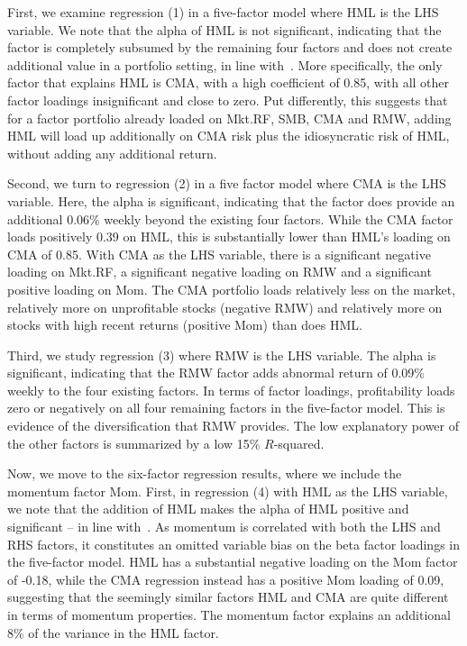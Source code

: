 First, we examine regression (1) in a five-factor model where HML is the LHS variable. We note that the alpha of HML is not significant, indicating that the factor is completely subsumed by the remaining four factors and does not create additional value in a portfolio setting, in line with~\textcite{FF2015}. More specifically, the only factor that explains HML is CMA, with a high coefficient of 0.85, with all other factor loadings insignificant and close to zero. Put differently, this suggests that for a factor portfolio already loaded on Mkt.RF, SMB, CMA and RMW, adding HML will load up additionally on CMA risk plus the idiosyncratic risk of HML, without adding any additional return.

Second, we turn to regression (2) in a five factor model where CMA is the LHS variable. Here, the alpha is significant, indicating that the factor does provide an additional 0.06\% weekly beyond the existing four factors. While the CMA factor loads positively 0.39 on HML, this is substantially lower than HML's loading on CMA of 0.85. With CMA as the LHS variable, there is a significant negative loading on Mkt.RF, a significant negative loading on RMW and a significant positive loading on Mom. The CMA portfolio loads relatively less on the market, relatively more on unprofitable stocks (negative RMW) and relatively more on stocks with high recent returns (positive Mom) than does HML.

Third, we study regression (3) where RMW is the LHS variable. The alpha is significant, indicating that the RMW factor adds abnormal return of 0.09\% weekly to the four existing factors. In terms of factor loadings, profitability loads zero or negatively on all four remaining factors in the five-factor model. This is evidence of the diversification that RMW provides. The low explanatory power of the other factors is summarized by a low 15\% $R$-squared.



Now, we move to the six-factor regression results, where we include the momentum factor Mom. First, in regression (4) with HML as the LHS variable, we note that the addition of HML makes the alpha of HML positive and significant -- in line with~\textcite{Asness2015}. As momentum is correlated with both the LHS and RHS factors, it constitutes an omitted variable bias on the beta factor loadings in the five-factor model. HML has a substantial negative loading on the Mom factor of -0.18, while the CMA regression instead has a positive Mom loading of 0.09, suggesting that the seemingly similar factors HML and CMA are quite different in terms of momentum properties. The momentum factor explains an additional 8\% of the variance in the HML factor. 

